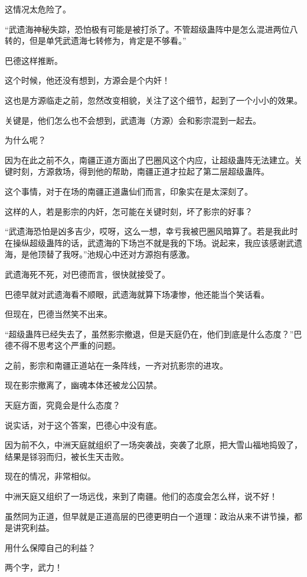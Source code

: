 \begin{this_body}
这情况太危险了。

“武遗海神秘失踪，恐怕极有可能是被打杀了。不管超级蛊阵中是怎么混进两位八转的，但是单凭武遗海七转修为，肯定是不够看。”

巴德这样推断。

这个时候，他还没有想到，方源会是个内奸！

这也是方源临走之前，忽然改变相貌，关注了这个细节，起到了一个小小的效果。

关键是，他们怎么也不会想到，武遗海（方源）会和影宗混到一起去。

为什么呢？

因为在此之前不久，南疆正道方面出了巴圈风这个内应，让超级蛊阵无法建立。关键时刻，方源救场，得到他的帮助，南疆正道才拉起了第二层超级蛊阵。

这个事情，对于在场的南疆正道蛊仙们而言，印象实在是太深刻了。

这样的人，若是影宗的内奸，怎可能在关键时刻，坏了影宗的好事？

“武遗海恐怕是凶多吉少，哎呀，这么一想，幸亏我被巴圈风暗算了。若是我此时在操纵超级蛊阵的话，武遗海的下场岂不就是我的下场。说起来，我应该感谢武遗海，是他顶替了我呀。”池规心中还对方源抱有感激。

武遗海死不死，对巴德而言，很快就接受了。

巴德早就对武遗海看不顺眼，武遗海就算下场凄惨，他还能当个笑话看。

但现在，巴德当然笑不出来。

“超级蛊阵已经失去了，虽然影宗撤退，但是天庭仍在，他们到底是什么态度？”巴德不得不思考这个严重的问题。

之前，影宗和南疆正道站在一条阵线，一齐对抗影宗的进攻。

现在影宗撤离了，幽魂本体还被龙公囚禁。

天庭方面，究竟会是什么态度？

说实话，对于这个答案，巴德心中没有底。

因为前不久，中洲天庭就组织了一场突袭战，突袭了北原，把大雪山福地捣毁了，结果是铩羽而归，被长生天击败。

现在的情况，非常相似。

中洲天庭又组织了一场远伐，来到了南疆。他们的态度会怎么样，说不好！

虽然同为正道，但早就是正道高层的巴德更明白一个道理：政治从来不讲节操，都是讲究利益。

用什么保障自己的利益？

两个字，武力！


\end{this_body}
